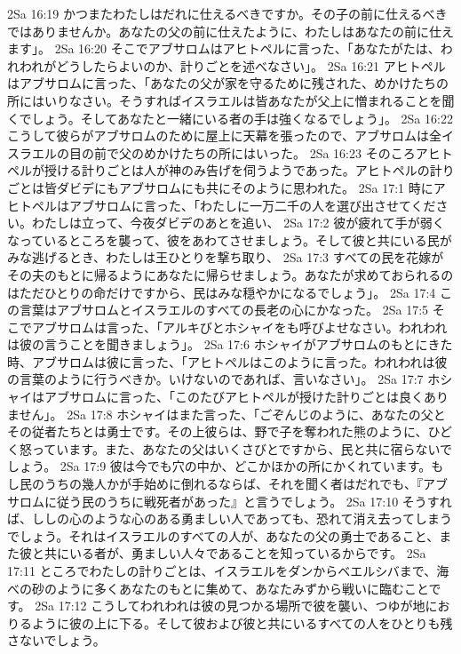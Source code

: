 2Sa 16:19  かつまたわたしはだれに仕えるべきですか。その子の前に仕えるべきではありませんか。あなたの父の前に仕えたように、わたしはあなたの前に仕えます」。
2Sa 16:20  そこでアブサロムはアヒトペルに言った、「あなたがたは、われわれがどうしたらよいのか、計りごとを述べなさい」。
2Sa 16:21  アヒトペルはアブサロムに言った、「あなたの父が家を守るために残された、めかけたちの所にはいりなさい。そうすればイスラエルは皆あなたが父上に憎まれることを聞くでしょう。そしてあなたと一緒にいる者の手は強くなるでしょう」。
2Sa 16:22  こうして彼らがアブサロムのために屋上に天幕を張ったので、アブサロムは全イスラエルの目の前で父のめかけたちの所にはいった。
2Sa 16:23  そのころアヒトペルが授ける計りごとは人が神のみ告げを伺うようであった。アヒトペルの計りごとは皆ダビデにもアブサロムにも共にそのように思われた。
2Sa 17:1  時にアヒトペルはアブサロムに言った、「わたしに一万二千の人を選び出させてください。わたしは立って、今夜ダビデのあとを追い、
2Sa 17:2  彼が疲れて手が弱くなっているところを襲って、彼をあわてさせましょう。そして彼と共にいる民がみな逃げるとき、わたしは王ひとりを撃ち取り、
2Sa 17:3  すべての民を花嫁がその夫のもとに帰るようにあなたに帰らせましょう。あなたが求めておられるのはただひとりの命だけですから、民はみな穏やかになるでしょう」。
2Sa 17:4  この言葉はアブサロムとイスラエルのすべての長老の心にかなった。
2Sa 17:5  そこでアブサロムは言った、「アルキびとホシャイをも呼びよせなさい。われわれは彼の言うことを聞きましょう」。
2Sa 17:6  ホシャイがアブサロムのもとにきた時、アブサロムは彼に言った、「アヒトペルはこのように言った。われわれは彼の言葉のように行うべきか。いけないのであれば、言いなさい」。
2Sa 17:7  ホシャイはアブサロムに言った、「このたびアヒトペルが授けた計りごとは良くありません」。
2Sa 17:8  ホシャイはまた言った、「ごぞんじのように、あなたの父とその従者たちとは勇士です。その上彼らは、野で子を奪われた熊のように、ひどく怒っています。また、あなたの父はいくさびとですから、民と共に宿らないでしょう。
2Sa 17:9  彼は今でも穴の中か、どこかほかの所にかくれています。もし民のうちの幾人かが手始めに倒れるならば、それを聞く者はだれでも、『アブサロムに従う民のうちに戦死者があった』と言うでしょう。
2Sa 17:10  そうすれば、ししの心のような心のある勇ましい人であっても、恐れて消え去ってしまうでしょう。それはイスラエルのすべての人が、あなたの父の勇士であること、また彼と共にいる者が、勇ましい人々であることを知っているからです。
2Sa 17:11  ところでわたしの計りごとは、イスラエルをダンからベエルシバまで、海べの砂のように多くあなたのもとに集めて、あなたみずから戦いに臨むことです。
2Sa 17:12  こうしてわれわれは彼の見つかる場所で彼を襲い、つゆが地におりるように彼の上に下る。そして彼および彼と共にいるすべての人をひとりも残さないでしょう。
